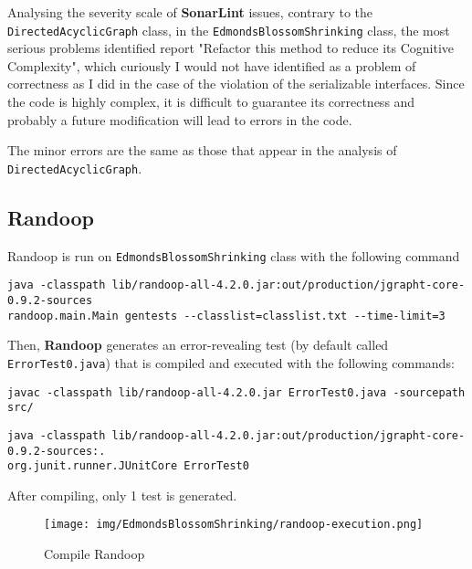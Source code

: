\documentclass[a4paper,12pt]{article} %
\begin{document}
	Analysing  the severity scale of \textbf{SonarLint} issues, contrary to the \texttt{DirectedAcyclicGraph} class, in the \texttt{EdmondsBlossomShrinking} class, the most serious problems identified report "Refactor this method to reduce its Cognitive Complexity", which curiously I would not have identified as a problem of correctness as I did in the case of the violation of the serializable interfaces. 
	Since the code is highly complex, it is difficult to guarantee its correctness and probably a future modification will lead to errors in the code.
	
	The minor errors are the same as those that appear in the analysis of \texttt{DirectedAcyclicGraph}.
		
	\subsection*{Randoop}
	Randoop is run on \texttt{EdmondsBlossomShrinking} class with the following command
	
	\begin{lstlisting}[style=DOS,caption={Randoop Execution}, captionpos=b]
java -classpath lib/randoop-all-4.2.0.jar:out/production/jgrapht-core-0.9.2-sources 
randoop.main.Main gentests --classlist=classlist.txt --time-limit=3
	\end{lstlisting}
	
	Then, \textbf{Randoop} generates an error-revealing test (by default called \\ \texttt{ErrorTest0.java}) that is compiled and executed with the following commands:
	\begin{lstlisting}[style=DOS,caption={Compile Error Revealing Test}, captionpos=b]
javac -classpath lib/randoop-all-4.2.0.jar ErrorTest0.java -sourcepath src/
	\end{lstlisting}
	
	\begin{lstlisting}[style=DOS,caption={Execute Error Revealing Test}, captionpos=b]
java -classpath lib/randoop-all-4.2.0.jar:out/production/jgrapht-core-0.9.2-sources:. 
org.junit.runner.JUnitCore ErrorTest0
	\end{lstlisting}	
	
After compiling, only 1 test is generated.
	\begin{figure}[H]
		\centering
		\texttt{[image: img/EdmondsBlossomShrinking/randoop-execution.png]}
		\caption{Compile {Randoop}}
		\label{fig:randexe-ed}
	\end{figure}
	
\end{document}
